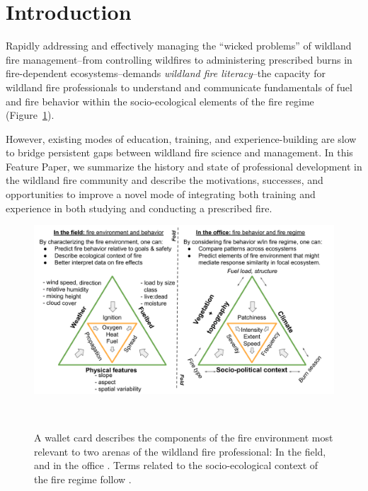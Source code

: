 \documentclass[fire,casereport,accept,moreauthors,pdftex]{Definitions/mdpi}  %
\begin{document}
\section{Introduction}

Rapidly addressing and effectively managing the ``wicked problems'' of wildland fire management--from controlling wildfires to administering prescribed burns in fire-dependent ecosystems--demands \emph{{wildland fire literacy}}--the capacity for wildland fire professionals to understand and communicate fundamentals of fuel and fire behavior within the socio-ecological elements of the fire regime (Figure~\ref{WalletCard}). %

However, existing modes of education, training, and experience-building are slow to bridge persistent gaps between wildland fire science and management.
In this Feature Paper, we summarize the history and state of professional development in the wildland fire community and describe the motivations, successes, and opportunities to improve a novel mode of integrating both training and experience in both studying and conducting a prescribed fire.

\begin{figure}[H]
\includegraphics[width=1\columnwidth]{WalletCard.pdf}
\caption{A wallet card  describes the components of the fire environment most relevant to two arenas of the wildland fire professional: In the field, and in{ the office} \citep{mcgranahan2018}.
Terms related to the socio-ecological context of the fire {regime follow }\citet{mcgranahan2021}.}
\label{WalletCard}\ %

\end{figure}
\end{document}
